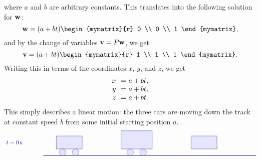 \begin{solution}
\begin{itemize}
    where $a$ and $b$ are arbitrary constants. This translates into
    the following solution for $\mbox{\bf w}$:
    \begin{equation*}
      \vect{w}
      = (a+bt)\begin{mymatrix}{r} 0 \\ 0 \\ 1 \end{mymatrix},
    \end{equation*}
    and by the change of variables $\mbox{\bf v} = P\mbox{\bf w}$, we get
    \begin{equation*}
      \vect{v}
      = (a+bt)\begin{mymatrix}{r} 1 \\ 1 \\ 1 \end{mymatrix}.
    \end{equation*}
    Writing this in terms of the coordinates $x$, $y$, and $z$, we get
    \begin{equation*}
      \begin{array}{c@{~~}c@{~}l}
        x &=& a+bt, \\
        y &=& a+bt, \\
        z &=& a+bt. \\
      \end{array}
    \end{equation*}
    This simply describes a linear motion: the three cars are moving
    down the track at constant speed $b$ from some initial starting
    position $a$.
    \begin{equation*}
      \begin{tikzpicture}[scale=0.8, color=blue!50!black]
        \begin{scope}[yshift=0cm]
          \draw (-3,1) node[right] {$t=0\s$};
          \draw[thick] (0,0) -- (16.4,0);
          \begin{scope}[xshift=-1cm]
            \draw[fill=blue!10] (2,0.5) rectangle (4,1.5);
            \draw[fill=blue!10] (2.5,0.25) circle (0.25);
            \draw[fill=blue!10] (3.5,0.25) circle (0.25);
          \end{scope}
          \begin{scope}[xshift=4.2cm]
            \draw[fill=blue!10] (1.8,0.5) rectangle (4.2,1.9);
            \draw[fill=blue!10] (2.5,0.25) circle (0.25);
            \draw[fill=blue!10] (3.5,0.25) circle (0.25);
          \end{scope}
          \begin{scope}[xshift=9.4cm]
            \draw[fill=blue!10] (2,0.5) rectangle (4,1.5);

\end{scope}
\end{scope}
\end{tikzpicture}
\end{equation*}
\end{itemize}
\end{solution}
